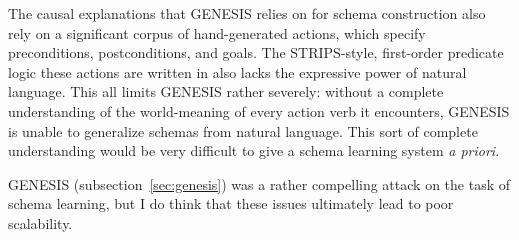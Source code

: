 The causal explanations that GENESIS relies on for schema construction also rely on a significant corpus of hand-generated actions, which specify preconditions, postconditions, and goals. The STRIPS-style, first-order predicate logic these actions are written in also lacks the expressive power of natural language. This all limits GENESIS rather severely: without a complete understanding of the world-meaning of every action verb it encounters, GENESIS is unable to generalize schemas from natural language. This sort of complete understanding would be very difficult to give a schema learning system \textit{a priori}.

GENESIS (subsection~\vref{sec:genesis}) was a rather compelling attack on the task of schema learning, but I do think that these issues ultimately lead to poor scalability.